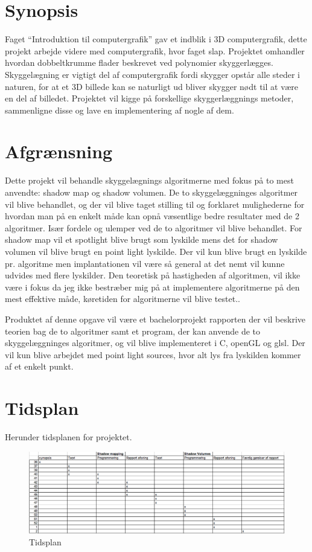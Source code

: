 \documentclass[11pt,a4paper]{article}
\begin{document}
\section{Synopsis}
Faget “Introduktion til computergrafik” gav et indblik i 3D computergrafik, dette projekt arbejde videre med computergrafik, hvor faget slap. Projektet omhandler hvordan dobbeltkrumme flader beskrevet ved polynomier skyggerlægges. Skyggelægning er vigtigt del af computergrafik fordi skygger opstår alle steder i naturen, for at et 3D billede kan se naturligt ud bliver skygger nødt til at være en del af billedet. Projektet vil kigge på forskellige skyggerlæggnings metoder, sammenligne disse og lave en implementering af nogle af dem.

\section{Afgrænsning}
Dette projekt vil behandle skyggelægnings algoritmerne med fokus på to mest anvendte: shadow map og shadow volumen. De to skyggelæggninges algoritmer vil blive behandlet, og der vil blive taget stilling til og forklaret mulighederne for hvordan man på en enkelt måde kan opnå væsentlige bedre resultater med de 2 algoritmer. Især fordele og ulemper ved de to algoritmer vil blive behandlet. For shadow map vil et spotlight blive brugt som lyskilde mens det for shadow volumen vil blive brugt en point light lyskilde. Der vil kun blive brugt en lyskilde pr. algoritme men implantationen vil være så general at det nemt vil kunne udvides med flere lyskilder. Den teoretisk på hastigheden af algoritmen,  vil ikke være i fokus da jeg ikke bestræber mig på at implementere algoritmerne på den mest effektive måde, køretiden for algoritmerne vil blive testet..

Produktet af denne opgave vil være et bachelorprojekt rapporten der vil beskrive teorien bag de to algoritmer samt et program, der kan anvende de to skyggelæggninges algoritmer, og vil blive implementeret i C, openGL og glsl. Der vil kun blive arbejdet med point light sources, hvor alt lys fra lyskilden kommer af et enkelt punkt.
\section{Tidsplan}

Herunder tidsplanen for projektet.

\begin{figure}[ht!]
\centering
\includegraphics[width=140mm]{tid.png}
\caption{Tidsplan}
\label{S4}
\end{figure}
\end{document}
